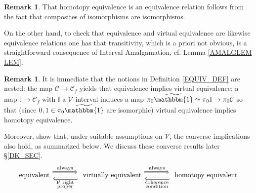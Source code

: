\documentclass[a4paper,10pt
,draft
]{article}%
\numberwithin{equation}{section}
\numberwithin{figure}{section}
\newtheorem{proposition}[equation]{Proposition}%
\theoremstyle{definition} %
\newtheorem{remark}[equation]{Remark}%
\newcommand{\V}{\ensuremath{\mathcal V}}
\renewcommand{\O}{\ensuremath{\mathcal O}}
\newcommand{\J}{\mathbb J}
\newcommand{\1}{\ensuremath{\mathbbm 1}}%
\begin{document}
\begin{remark}
That homotopy equivalence is an equivalence relation 
follows from the fact that composites of isomorphisms are isomorphisms.

On the other hand, to check that equivalence and virtual equivalence are likewise equivalence relations
one has that transitivity, which is a priori not obvious,
is a straightforward consequence of Interval Amalgamation, cf. Lemma \ref{AMALGLEM LEM}.
\end{remark}







\begin{remark}
It is immediate that the notions in Definition \ref{EQUIV_DEF}
are nested: the map $\mathcal{C} \to \mathcal{C}_f$
yields that equivalence implies virtual equivalence;
a map $\mathbb{I} \to \mathcal{C}_f$
with $\mathbb{I}$ a $\mathcal{V}$-interval
induces a map
$\pi_0 \widetilde{\mathbbm{1}} \simeq \pi_0 \mathbb{I} \to \pi_0 \mathcal{C}$ so that (since $0,1 \in \pi_0 \widetilde{\mathbbm{1}}$ are isomorphic)
virtual equivalence implies homotopy equivalence.

Moreover, \cite{BM13,Cav} show that, under suitable assumptions on $\V$, the converse implications also hold, as summarized below.
We discuss these converse results {\color{red} later \S \ref{DK_SEC}}.
\begin{equation}\label{BASCOMP EQ}
\begin{tikzcd}[column sep = large]
            \mbox{equivalent}
            \arrow[r, Rightarrow, shift left=2, "\mathrm{always}"]
            &
            \mbox{ virtually equivalent}
            \arrow[r, Rightarrow, shift left=2, "\mathrm{always}"]
            \arrow[l, Rightarrow, shift left = 2, "\substack{$\V\phantom{ }$\mathrm{right} \\ \mathrm{proper}}"]
            &
            \mbox{ homotopy equivalent}
            \arrow[l, Rightarrow, shift left = 2, "\substack{\mathrm{coherence} \\ \mathrm{condition}}"]
\end{tikzcd}
\end{equation}
\end{remark}
\end{document}
